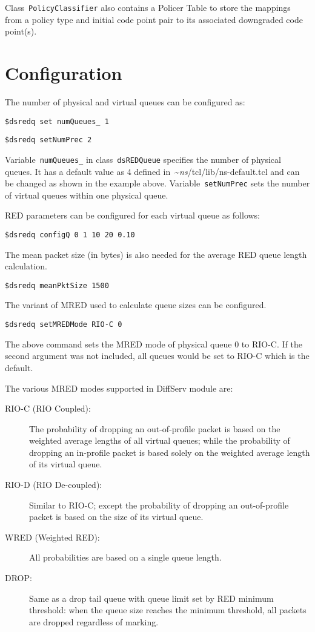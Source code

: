 Class~{\tt PolicyClassifier} also contains a Policer Table to 
  store the mappings from a policy type and initial code point pair to 
  its associated downgraded code point(s).  

\section{Configuration}
\label{sec:diffservconfig}

The number of physical and virtual queues can be configured as:

{\tt \$dsredq set numQueues\_ 1}

{\tt \$dsredq setNumPrec 2}

Variable~{\tt numQueues\_} in class~{\tt dsREDQueue}
  specifies the number of physical queues.
It has a default value as 4 defined in~\textasciitilde\emph{ns}/{tcl/lib/ns-default.tcl} 
  and can be changed as shown in the example above.
Variable~{\tt setNumPrec} sets the number of virtual queues
  within one physical queue.

RED parameters can be configured for each virtual queue as follows:

{\tt \$dsredq configQ 0 1 10 20 0.10}

The mean packet size (in bytes) is also needed for 
  the average RED queue length calculation.

{\tt \$dsredq meanPktSize 1500}

The variant of MRED used to calculate queue sizes can be configured.

{\tt \$dsredq setMREDMode RIO-C 0}

The above command sets the MRED mode of physical queue 0 to RIO-C. 
If the second argument was not included, 
  all queues would be set to RIO-C 
  which is the default. 

The various MRED modes supported in DiffServ module are:
\begin{description}
\item [RIO-C (RIO Coupled):] 
The probability of dropping an out-of-profile packet is based on 
  the weighted average lengths of all virtual queues; 
  while the probability of dropping an in-profile packet is based solely on 
  the weighted average length of its virtual queue.

\item [RIO-D (RIO De-coupled):] 
Similar to RIO-C; 
  except the probability of dropping an out-of-profile packet is based on 
  the size of its virtual queue.

\item [WRED (Weighted RED):] 
All probabilities are based on a single queue length. 

\item [DROP:] 
Same as a drop tail queue with queue limit set by RED minimum threshold: 
  when the queue size reaches the minimum threshold, 
  all packets are dropped regardless of marking.
\end{description}


